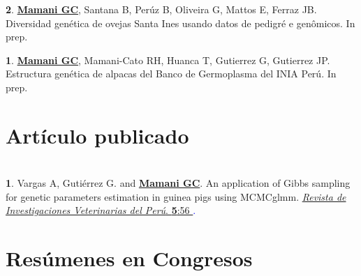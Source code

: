 \documentclass[margin,line,10pt]{res}
\newenvironment{list1}{
  \begin{list}{\ding{113}}{%
      \setlength{\itemsep}{0in}
      \setlength{\parsep}{0in} \setlength{\parskip}{0in}
      \setlength{\topsep}{0in} \setlength{\partopsep}{0in} 
      \setlength{\leftmargin}{0.17in}}}{\end{list}}
\begin{document}
\begin{resume}
\begin{list1}
\item [{\bf 2}.]  {\bf \underline{Mamani GC}}, Santana B, Perúz B, Oliveira G, Mattos E, Ferraz JB.   
     Diversidad genética de ovejas Santa Ines usando datos de pedigré e genômicos. In prep. %
\vspace{0.5cm}

\item [{\bf 1}.]  {\bf \underline{Mamani GC}}, Mamani-Cato RH, Huanca T, Gutierrez G, Gutierrez JP.   
     Estructura genética de alpacas del Banco de Germoplasma del INIA Perú. In prep. %

\end{list1}
\vspace{0.5cm}

\vspace{0.5cm}
\section{\sc Artículo publicado}

\vspace{0.9cm}
\section{}

\begin{list1}
\item [{\bf 1}.]  Vargas A, Gutiérrez G. and {\bf \underline{Mamani GC}}.  
 An application of Gibbs sampling for genetic parameters estimation in guinea pigs using MCMCglmm.   
     \textcolor{blue}{\href{http://dev.scielo.org.pe/scielo.php?script=sci_arttext&pid=S1609-91172015000200003&lng=en&nrm=iso}{ {\it Revista de Investigaciones Veterinarias del Perú}. {\bf 5}:56 }. } 
     \end{list1}
\vspace{0.5cm}

\vspace{0.5cm}
\section{\sc Resúmenes en Congresos}
\vspace{0.9cm}

\section{}
\begin{list1}


\end{list1}
\end{resume}
\end{document}

